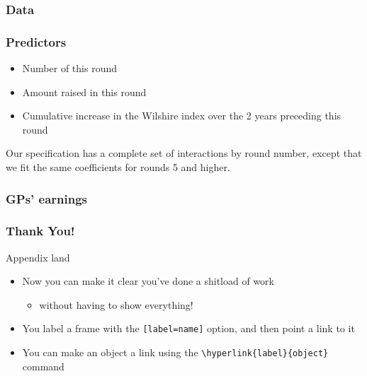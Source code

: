 \documentclass[12pt, aspectratio=169]{beamer}
\begin{document}

\begin{frame}
\frametitle{Data}

\centerline{
}

\end{frame}




\begin{frame}
\frametitle{Predictors}

\begin{itemize}
\item Number of this round
\item Amount raised in this round
\item Cumulative increase in the Wilshire index over the 2 years
preceding this round
\end{itemize}
\vspace{.5in}

Our specification has a complete set of
interactions by round number, except that we fit
the same coefficients for rounds 5 and higher.

\end{frame}


\begin{frame}
\frametitle{GPs' earnings}

\centerline{
}

\end{frame}



\begin{frame}
\frametitle{Thank You!}
\end{frame}


\appendix
\begin{frame}[label=appendix_end]{Appendix land}
  \begin{itemize}
    \item[] Now you can make it clear you've done a shitload of work
      \begin{itemize}
      \item[]  without having to show everything! \hyperlink{data_slide}{}
      \end{itemize}
    \item[] You label a frame with the \texttt{[label=name]} option, and then point a link to it
    \item[] You can make an object a link using the \texttt{\textbackslash hyperlink\{label\}\{object\}} command
  \end{itemize}
\end{frame}
\end{document}
